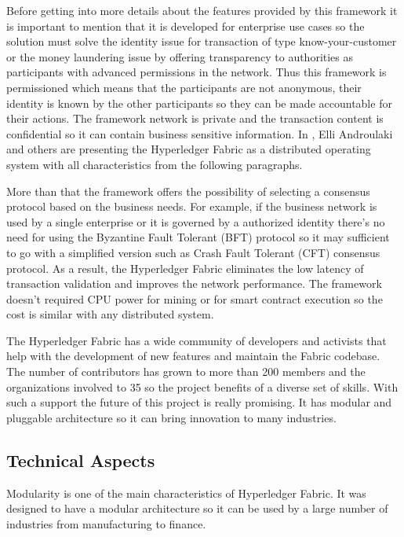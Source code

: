 Before getting into more details about the features provided by this framework it is important to mention that it is developed for enterprise use cases so the solution must solve the identity issue for transaction of type know-your-customer or the money laundering issue by offering transparency to authorities as participants with advanced permissions in the network. Thus this framework is permissioned which means that the participants are not anonymous, their identity is known by the other participants so they can be made accountable for their actions. The framework network is private and the transaction content is confidential so it can contain business sensitive information. In \cite{fabric-article}, Elli Androulaki and others are presenting the Hyperledger Fabric as a distributed operating system with all characteristics from the following paragraphs.

More than that the framework offers the  possibility of selecting a consensus protocol based on the business needs. For example, if the business network is used by a single enterprise or it is governed by a authorized identity there's no need for using the Byzantine Fault Tolerant (BFT) protocol so it may sufficient to go with a simplified version such as Crash Fault Tolerant (CFT) consensus protocol. As a result, the Hyperledger Fabric eliminates the low latency of transaction validation and  improves the network performance. The framework doesn't required CPU power for mining or for smart contract execution so the cost is similar with any distributed system.

The Hyperledger Fabric has a wide community of developers and activists that help with the development of new features and maintain the Fabric codebase. The number of contributors has grown to more than 200 members and the organizations involved to 35 so the project benefits of a diverse set of skills. With such a support the future of this project is really promising. It has modular and pluggable architecture so it can bring innovation to many industries.

\subsection{Technical Aspects}
\label{sub-sec:chapter1-subsection2}

Modularity is one of the main characteristics of Hyperledger Fabric. It was
designed to have a modular architecture so it can be used by a large number of industries from manufacturing to finance. 

